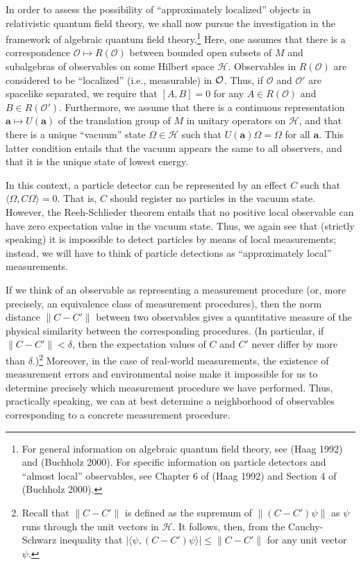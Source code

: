 \documentclass[11pt]{article}
\theoremstyle{remark}
\newcommand{\abs}[1]{\mbox{$|#1|$}}
\newcommand{\norm}[1]{\mbox{$\| #1\|$}}
\newcommand{\hil}[1]{\mathcal{#1}}
\begin{document}
In order to assess the possibility of ``approximately localized''
objects in relativistic quantum field theory, we shall now pursue the
investigation in the framework of algebraic quantum field
theory.\footnote{For general information on algebraic quantum field
  theory, see (Haag 1992) and (Buchholz 2000).  For specific
  information on particle detectors and ``almost local'' observables,
  see Chapter 6 of (Haag 1992) and Section 4 of (Buchholz 2000).}
Here, one assumes that there is a correspondence $\hil{O} \mapsto
R(\hil{O})$ between bounded open subsets of $M$ and subalgebras of
observables on some Hilbert space $\hil{H}$.  Observables in
$R(\hil{O})$ are considered to be ``localized'' (i.e., measurable) in
$\cal{O}$.  Thus, if $\mathcal{O}$ and $\mathcal{O}'$ are spacelike
separated, we require that $[A,B]=0$ for any $A\in R(\mathcal{O})$ and
$B\in R(\mathcal{O}')$.  Furthermore, we assume that there is a
continuous representation $\mathbf{a}\mapsto U(\mathbf{a})$ of the
translation group of $M$ in unitary operators on $\hil{H}$, and that
there is a unique ``vacuum'' state $\Omega \in \hil{H}$ such that
$U(\mathbf{a})\Omega =\Omega$ for all $\mathbf{a}$.  This latter
condition entails that the vacuum appears the same to all observers,
and that it is the unique state of lowest energy.

In this context, a particle detector can be represented by an effect
$C$ such that $\langle \Omega ,C\Omega \rangle =0$.  That is, $C$
should register no particles in the vacuum state.  However, the
Reeh-Schlieder theorem entails that no positive local observable can
have zero expectation value in the vacuum state.  Thus, we again see
that (strictly speaking) it is impossible to detect particles by means
of local measurements; instead, we will have to think of particle
detections as ``approximately local'' measurements.

If we think of an observable as representing a measurement procedure
(or, more precisely, an equivalence class of measurement procedures),
then the norm distance $\norm{C-C'}$ between two observables gives a
quantitative measure of the physical similarity between the
corresponding procedures.  (In particular, if $\norm{C-C'}<\delta$,
then the expectation values of $C$ and $C'$ never differ by more than
$\delta$.)\footnote{Recall that $\norm{C-C'}$ is defined as the
  supremum of $\norm{(C-C')\psi }$ as $\psi$ runs through the unit
  vectors in $\hil{H}$.  It follows, then, from the Cauchy-Schwarz
  inequality that $\abs{\langle \psi ,(C-C')\psi \rangle }\leq
  \norm{C-C'}$ for any unit vector $\psi$.}  Moreover, in the case of
real-world measurements, the existence of measurement errors and
environmental noise make it impossible for us to determine precisely
which measurement procedure we have performed.  Thus, practically
speaking, we can at best determine a neighborhood of observables
corresponding to a concrete measurement procedure.
\end{document}

